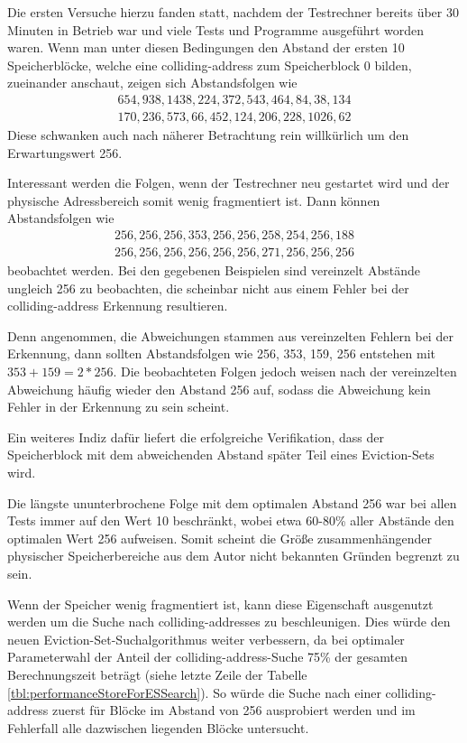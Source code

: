 Die ersten Versuche hierzu fanden statt, nachdem der Testrechner bereits über 30 Minuten in Betrieb war und viele Tests und Programme ausgeführt worden waren.
Wenn man unter diesen Bedingungen den Abstand der ersten 10 Speicherblöcke, welche eine colliding-address zum Speicherblock 0 bilden, zueinander anschaut, zeigen sich Abstandsfolgen wie 
\begin{align*} 
654, 938, 1438, 224, 372, 543, 464, 84, 38, 134\\
170, 236, 573, 66, 452, 124, 206, 228, 1026, 62
\end{align*}
Diese schwanken auch nach näherer Betrachtung rein willkürlich um den Erwartungswert 256.

Interessant werden die Folgen, wenn der Testrechner neu gestartet wird und der physische Adressbereich somit wenig fragmentiert ist.
Dann können Abstandsfolgen wie 
\begin{align*} 
256, 256, 256, 353, 256, 256, 258, 254, 256, 188\\
256, 256, 256, 256, 256, 256, 271, 256, 256, 256
\end{align*}
beobachtet werden.
Bei den gegebenen Beispielen sind vereinzelt Abstände ungleich 256 zu beobachten, die scheinbar nicht aus einem Fehler bei der colliding-address Erkennung resultieren.

Denn angenommen, die Abweichungen stammen aus vereinzelten Fehlern bei der Erkennung, dann sollten Abstandsfolgen wie 256, 353, 159, 256 entstehen mit $353+159=2*256$.
Die beobachteten Folgen jedoch weisen nach der vereinzelten Abweichung häufig wieder den Abstand 256 auf, sodass die Abweichung kein Fehler in der Erkennung zu sein scheint.

Ein weiteres Indiz dafür liefert die erfolgreiche Verifikation, dass der Speicherblock mit dem abweichenden Abstand später Teil eines Eviction-Sets wird.

Die längste ununterbrochene Folge mit dem optimalen Abstand 256 war bei allen Tests immer auf den Wert 10 beschränkt, wobei etwa 60-80\% aller Abstände den optimalen Wert 256 aufweisen.
Somit scheint die Größe zusammenhängender physischer Speicherbereiche aus dem Autor nicht bekannten Gründen begrenzt zu sein.

Wenn der Speicher wenig fragmentiert ist, kann diese Eigenschaft ausgenutzt werden um die Suche nach colliding-addresses zu beschleunigen.
Dies würde den neuen Eviction-Set-Suchalgorithmus weiter verbessern, da bei optimaler Parameterwahl der Anteil der colliding-address-Suche 75\% der gesamten Berechnungszeit beträgt (siehe letzte Zeile der Tabelle \ref{tbl:performanceStoreForESSearch}).
So würde die Suche nach einer colliding-address zuerst für Blöcke im Abstand von 256 ausprobiert werden und im Fehlerfall alle dazwischen liegenden Blöcke untersucht.

